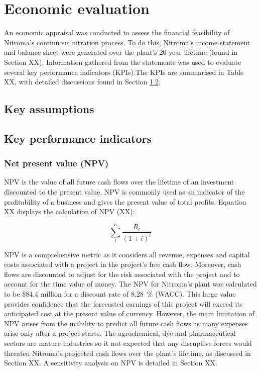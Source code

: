 \section{Economic evaluation}
An economic appraisal was conducted to assess the financial feasibility of Nitroma’s continuous nitration process. To do this, Nitroma’s income statement and balance sheet were generated over the plant’s 20-year lifetime (found in Section XX). Information gathered from the statements was used to evaluate several key performance indicators (KPIs).The KPIs are summarised in Table XX, with detailed discussions found in Section \ref{sec:KPIs}.

\subsection{Key assumptions}

\subsection{Key performance indicators}
\label{sec:KPIs}

\subsubsection{Net present value (NPV)}
NPV is the value of all future cash flows over the lifetime of an investment discounted to the present value. NPV is commonly used as an indicator of the profitability of a business and gives the present value of total profits. Equation XX displays the calculation of NPV (XX):

\begin{equation}
\label{eqn:npv}
    \sum_t^n\frac{R_{t}}{(1+i)^{t}}
\end{equation}

NPV is a comprehensive metric as it considers all revenue, expenses and capital costs associated with a project in the project’s free cash flow. Moreover, cash flows are discounted to adjust for the risk associated with the project and to account for the time value of money. The NPV for Nitroma’s plant was calculated to be \$84.4 million for a discount rate of \SI{8.28}{\percent} (WACC). This large value provides confidence that the forecasted earnings of this project will exceed its anticipated cost at the present value of currency. However, the main limitation of NPV arises from the inability to predict all future cash flows as many expenses arise only after a project starts. The agrochemical, dye and pharmaceutical sectors are mature industries so it not expected that any disruptive forces would threaten Nitroma’s projected cash flows over the plant’s lifetime, as discussed in Section XX. A sensitivity analysis on NPV is detailed in Section XX. 

